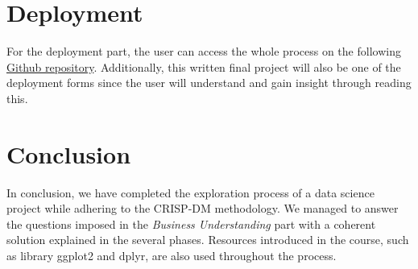 \documentclass[12pt,]{article}
\begin{document}
\hypertarget{deployment}{%
\section{Deployment}\label{deployment}}

For the deployment part, the user can access the whole process on the
following \href{https://github.com/c1040783/CSC8631}{Github repository}.
Additionally, this written final project will also be one of the
deployment forms since the user will understand and gain insight through
reading this.

\hypertarget{conclusion}{%
\section{Conclusion}\label{conclusion}}

In conclusion, we have completed the exploration process of a data
science project while adhering to the CRISP-DM methodology. We managed
to answer the questions imposed in the \emph{Business Understanding}
part with a coherent solution explained in the several phases. Resources
introduced in the course, such as library ggplot2 and dplyr, are also
used throughout the process.





\newpage
\singlespacing 

\end{document}
